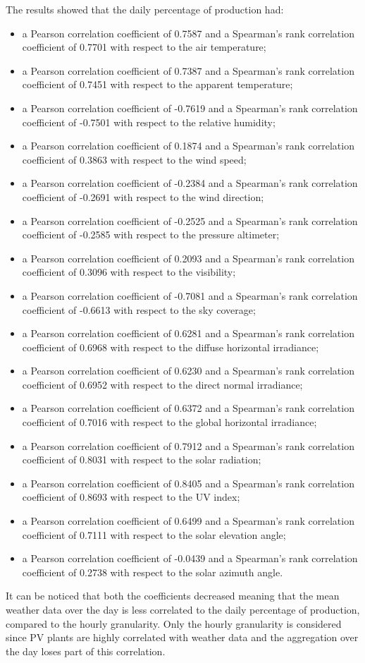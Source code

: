 The results showed that the daily percentage of production had:
\begin{itemize}
  \item a Pearson correlation coefficient of 0.7587 and a Spearman's rank correlation coefficient of 0.7701 with respect to the air temperature;
  \item a Pearson correlation coefficient of 0.7387 and a Spearman's rank correlation coefficient of 0.7451 with respect to the apparent temperature;
  \item a Pearson correlation coefficient of -0.7619 and a Spearman's rank correlation coefficient of -0.7501 with respect to the relative humidity;
  \item a Pearson correlation coefficient of 0.1874 and a Spearman's rank correlation coefficient of 0.3863 with respect to the wind speed;
  \item a Pearson correlation coefficient of -0.2384 and a Spearman's rank correlation coefficient of -0.2691 with respect to the wind direction;
  \item a Pearson correlation coefficient of -0.2525 and a Spearman's rank correlation coefficient of -0.2585 with respect to the pressure altimeter;
  \item a Pearson correlation coefficient of 0.2093 and a Spearman's rank correlation coefficient of 0.3096 with respect to the visibility;
  \item a Pearson correlation coefficient of -0.7081 and a Spearman's rank correlation coefficient of -0.6613 with respect to the sky coverage;
  \item a Pearson correlation coefficient of 0.6281 and a Spearman's rank correlation coefficient of 0.6968 with respect to the diffuse horizontal irradiance;
  \item a Pearson correlation coefficient of 0.6230 and a Spearman's rank correlation coefficient of 0.6952 with respect to the direct normal irradiance;
  \item a Pearson correlation coefficient of 0.6372 and a Spearman's rank correlation coefficient of 0.7016 with respect to the global horizontal irradiance;
  \item a Pearson correlation coefficient of 0.7912 and a Spearman's rank correlation coefficient of 0.8031 with respect to the solar radiation;
  \item a Pearson correlation coefficient of 0.8405 and a Spearman's rank correlation coefficient of 0.8693 with respect to the UV index;
  \item a Pearson correlation coefficient of 0.6499 and a Spearman's rank correlation coefficient of 0.7111 with respect to the solar elevation angle;
  \item a Pearson correlation coefficient of -0.0439 and a Spearman's rank correlation coefficient of 0.2738 with respect to the solar azimuth angle.
\end{itemize}
It can be noticed that both the coefficients decreased meaning that the mean weather data over the day is less correlated to the daily percentage of production, compared to the hourly granularity.
Only the hourly granularity is considered since PV plants are highly correlated with weather data and the aggregation over the day loses part of this correlation.

